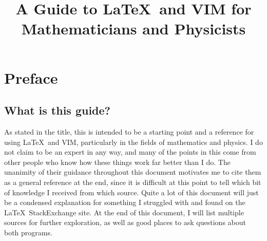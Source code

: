 \documentclass[a4paper, 12pt, twoside]{book}
\title{A Guide to \LaTeX\ and VIM for Mathematicians and Physicists}
\begin{document}
\maketitle
\tableofcontents
\pagebreak
\chapter*{Preface}
\section*{What is this guide?}
As stated in the title, this is intended to be a starting point and a reference for using \LaTeX\ and VIM, particularly in the fields of mathematics and physics. I do not claim to be an expert in any way, and many of the points in this come from other people who know how these things work far better than I do. The unanimity of their guidance throughout this document motivates me to cite them as a general reference at the end, since it is difficult at this point to tell which bit of knowledge I received from which source. Quite a lot of this document will just be a condensed explanation for something I struggled with and found on the \LaTeX\ StackExchange site. At the end of this document, I will list multiple sources for further exploration, as well as good places to ask questions about both programs.
\end{document}
